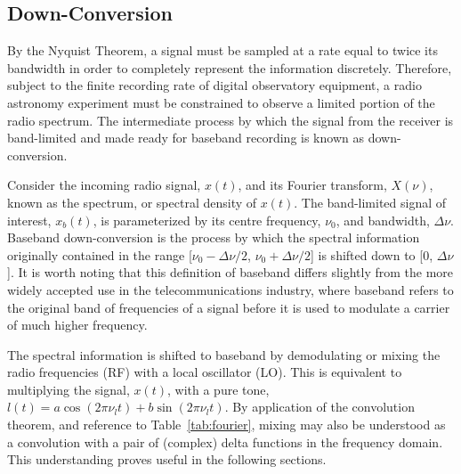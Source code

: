 \documentclass[twocolumn]{aastex6}
\newcommand{\Tab}[1]{Table~\ref{tab:#1}}
\newcommand{\bw}{\ensuremath{ \Delta\nu }}
\begin{document}
\begin{appendix}
\section{Down-Conversion}
\label{app:downconversion}

By the Nyquist Theorem, a signal must be sampled at a rate equal to
twice its bandwidth in order to completely represent the information
discretely.  Therefore, subject to the finite recording rate of
digital observatory equipment, a radio astronomy experiment must be
constrained to observe a limited portion of the radio spectrum.  The
intermediate process by which the signal from the receiver is
band-limited and made ready for baseband recording is known as
down-conversion.

Consider the incoming radio signal, $x(t)$, and its Fourier transform,
$X(\nu)$, known as the spectrum, or spectral density of $x(t)$.  The
band-limited signal of interest, $x_b(t)$, is parameterized by its
centre frequency, $\nu_0$, and bandwidth, \bw.  Baseband
down-conversion is the process by which the spectral information
originally contained in the range [$\nu_0-\Delta\nu/2$,
$\nu_0+\Delta\nu/2$] is shifted down to [0, \bw].  It is worth noting
that this definition of baseband differs slightly from the more widely
accepted use in the telecommunications industry, where baseband refers
to the original band of frequencies of a signal before it is used to
modulate a carrier of much higher frequency.


The spectral information is shifted to baseband by demodulating or
mixing the radio frequencies (RF) with a local oscillator (LO).  This
is equivalent to multiplying the signal, $x(t)$, with a pure tone,
$l(t)=a\cos(2\pi\nu_lt) + b\sin(2\pi\nu_lt)$.  By application of the
convolution theorem, and reference to \Tab{fourier}, mixing may also
be understood as a convolution with a pair of (complex) delta
functions in the frequency domain.  This understanding proves useful
in the following sections.


\end{appendix}
\end{document}
